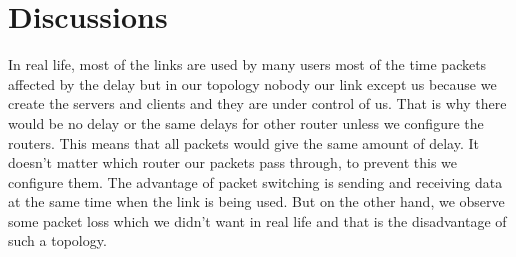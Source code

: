 \documentclass[conference]{IEEEtran}
\begin{document}
\section{Discussions}
In real life, most of the links are used by many users most of the time packets affected by the delay but in our topology nobody our link except us because we create the servers and clients and they are under control of us. That is why there would be no delay or the same delays for other router unless we configure the routers. This means that all packets would give the same amount of delay. It doesn't matter which router our packets pass through, to prevent this we configure them. The advantage of packet switching is sending and receiving data at the same time when the link is being used. But on the other hand, we observe some packet loss which we didn't want in real life and that is the disadvantage of such a topology.
\end{document}
